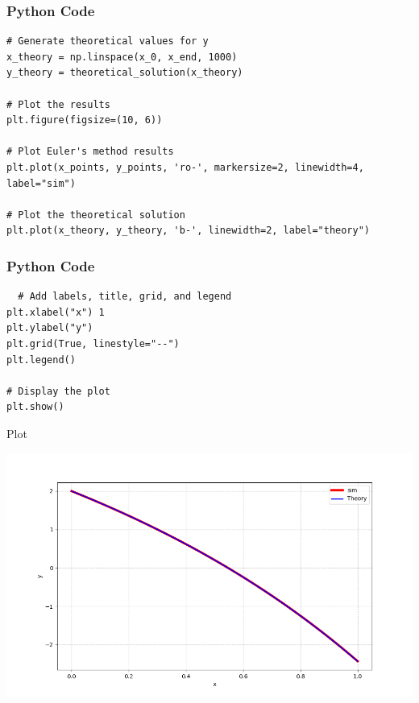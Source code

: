 \documentclass{beamer}
\begin{document}
\begin{frame}[fragile]
    \frametitle{Python Code}

    \begin{lstlisting}
# Generate theoretical values for y
x_theory = np.linspace(x_0, x_end, 1000)
y_theory = theoretical_solution(x_theory)

# Plot the results
plt.figure(figsize=(10, 6))

# Plot Euler's method results
plt.plot(x_points, y_points, 'ro-', markersize=2, linewidth=4, label="sim")

# Plot the theoretical solution
plt.plot(x_theory, y_theory, 'b-', linewidth=2, label="theory")

    \end{lstlisting}
\end{frame}

\begin{frame}[fragile]
    \frametitle{Python Code}

    \begin{lstlisting}
  # Add labels, title, grid, and legend
plt.xlabel("x") 1
plt.ylabel("y")
plt.grid(True, linestyle="--")
plt.legend()

# Display the plot
plt.show()
    \end{lstlisting}
\end{frame}

\begin{frame}{Plot}
    \begin{center}
        \includegraphics[width=\linewidth]{figs/Figure_1.png}
    \end{center}
\end{frame}
\end{document}
